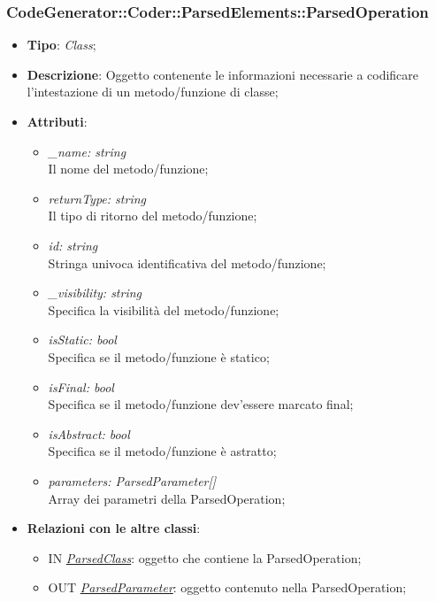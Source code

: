 \documentclass[../DefinizioneDiProdotto.tex]{subfiles}
\begin{document}
			\subsubsection{CodeGenerator::Coder::ParsedElements::ParsedOperation}
			\hypertarget{SWEDesigner::Server::CodeGenerator::Coder::ParsedElements::ParsedOperation}{}
			\begin{itemize}
				\item \textbf{Tipo}: \emph{Class};
				\item \textbf{Descrizione}: Oggetto contenente le informazioni necessarie a codificare l'intestazione di un metodo/funzione di classe;
				\item \textbf{Attributi}:
				\begin{itemize}
					\item \emph{\_name: string}\\
					Il nome del metodo/funzione;
					\item \emph{returnType: string}\\
					Il tipo di ritorno del metodo/funzione;
					\item \emph{id: string}\\
					Stringa univoca identificativa del metodo/funzione;
					\item \emph{\_visibility: string} \\
					Specifica la visibilità del metodo/funzione;
					\item \emph{isStatic: bool} \\
					Specifica se il metodo/funzione è statico;
					\item \emph{isFinal: bool} \\
					Specifica se il metodo/funzione dev'essere marcato final;
					\item \emph{isAbstract: bool} \\
					Specifica se il metodo/funzione è astratto;
					\item \emph{parameters: ParsedParameter[]} \\
					Array dei parametri della ParsedOperation;
				\end{itemize}
				\item \textbf{Relazioni con le altre classi}:
				\begin{itemize}
					\item IN \hyperlink{SWEDesigner::Server::CodeGenerator::Coder::ParsedElements::ParsedClass}{\emph{ParsedClass}}: oggetto che contiene la ParsedOperation;
					\item OUT \hyperlink{SWEDesigner::Server::CodeGenerator::Coder::ParsedElements::ParsedParameter}{\emph{ParsedParameter}}: oggetto contenuto nella ParsedOperation;
				\end{itemize}
			\end{itemize}
		
\end{document}
